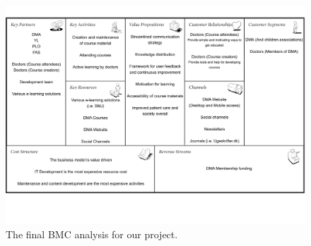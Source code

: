 \begin{figure}[h!]
 \begin{center}
  \includegraphics[width=1\textwidth]{figures/Business-Model-Canvas-v2.pdf}
  \caption{The final BMC analysis for our project.\label{fig:bmc2}}
 \end{center}
\end{figure}

